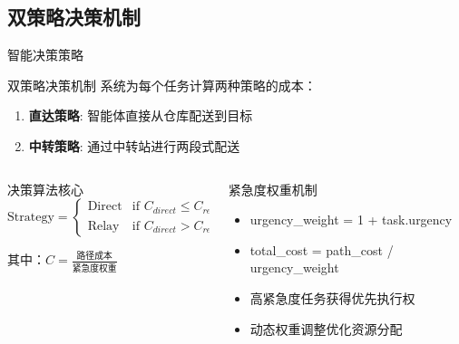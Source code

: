 \documentclass[
10pt,
aspectratio=169,
]{beamer}
\begin{document}
\subsection{双策略决策机制}

\begin{frame}{智能决策策略}
    \begin{block}{双策略决策机制}
        系统为每个任务计算两种策略的成本：
        \begin{enumerate}
            \item \textbf{直达策略}: 智能体直接从仓库配送到目标
            \item \textbf{中转策略}: 通过中转站进行两段式配送
        \end{enumerate}
    \end{block}
    
    \begin{columns}
        \begin{column}{0.5\textwidth}
            \begin{alertblock}{决策算法核心}
                \begin{equation}
                \text{Strategy} = \begin{cases}
                \text{Direct} & \text{if } C_{direct} \leq C_{relay} \\
                \text{Relay} & \text{if } C_{direct} > C_{relay}
                \end{cases}
                \end{equation}
                
                其中：$C = \frac{\text{路径成本}}{\text{紧急度权重}}$
            \end{alertblock}
        \end{column}
        \begin{column}{0.5\textwidth}
            \begin{block}{紧急度权重机制}
                \begin{itemize}
                    \item urgency\_weight = 1 + task.urgency
                    \item total\_cost = path\_cost / urgency\_weight
                    \item 高紧急度任务获得优先执行权
                    \item 动态权重调整优化资源分配
                \end{itemize}
            \end{block}
        \end{column}
    \end{columns}
\end{frame}
\end{document}
